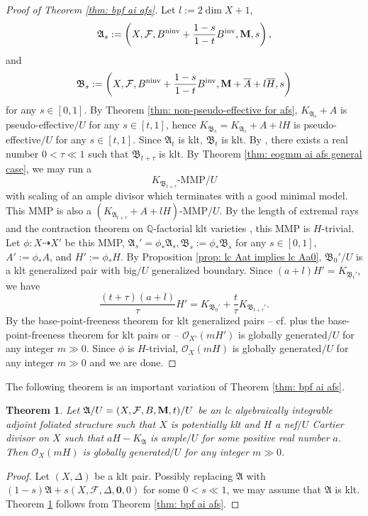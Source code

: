 \documentclass[12pt]{amsart}
\numberwithin{equation}{section}
\newcommand{\Mm}{{\bf{M}}}
\newcommand{\ninv}{\operatorname{ninv}}
\newcommand{\inv}{\operatorname{inv}}
\newcommand{\Aa}{{\mathfrak{A}}}
\newcommand{\Bb}{{\mathfrak{B}}}
\newcommand{\Ff}{\mathcal{F}}
\newtheorem{thm}{Theorem}[section]
\theoremstyle{definition}
\theoremstyle{definition}
\theoremstyle{definition}
\begin{document}
\begin{proof}[Proof of Theorem \ref{thm: bpf ai afs}]
Let $l:=2\dim X+1$, 
$$\Aa_s:=\left(X,\Ff,B^{\ninv}+\frac{1-s}{1-t}B^{\inv},\Mm,s\right),$$
and
$$\Bb_s:=\left(X,\Ff,B^{\ninv}+\frac{1-s}{1-t}B^{\inv},\Mm+\overline{A}+l\overline{H},s\right)$$ 
for any $s\in [0,1]$. By Theorem \ref{thm: non-pseudo-effective for afs}, $K_{\Aa_s}+A$ is pseudo-effective$/U$ for any $s\in [t,1]$, hence $K_{\Bb_s}=K_{\Aa_s}+A+lH$
is pseudo-effective$/U$ for any $s\in [t,1]$. Since $\Aa_t$ is klt, $\Bb_t$ is klt. By \cite[Lemma 3.2]{CHLMSSX24}, there exists a real number $0<\tau\ll 1$ such that $\Bb_{t+\tau}$ is klt. By Theorem \ref{thm: eogmm ai afs general case}, we may run a
$$K_{\Bb_{t+\tau}}\text{-MMP}/U$$
with scaling of an ample divisor which terminates with a good minimal model. This MMP is also a $(K_{\Aa_{t+\tau}}+A+lH)$-MMP$/U$. By the length of extremal rays and the contraction theorem on $\mathbb Q$-factorial klt varieties \cite[Theorem 1.3(2), Theorem 1.4(2)]{CHLMSSX24}, this MMP is $H$-trivial. Let $\phi: X\dashrightarrow X'$ be this MMP, $\Aa_s'=\phi_*\Aa_s,\Bb_s:=\phi_*\Bb_s$ for any $s\in [0,1]$, $A':=\phi_*A$, and $H':=\phi_*H$. By Proposition \ref{prop: lc Aat implies lc Aa0}, $\Bb_0'/U$ is a klt generalized pair with big$/U$ generalized boundary. Since $(a+l)H'=K_{\Bb_t'}$, we have
$$\frac{(t+\tau)(a+l)}{\tau}H'=K_{\Bb_0'}+\frac{t}{\tau}K_{\Bb_{t+\tau}'}.$$
By the base-point-freeness theorem for klt generalized pairs -- 
cf. \cite[Lemma 3.4]{HL22} plus the base-point-freeness theorem for klt pairs or \cite[Theorem 2.2.6]{CHLX23} -- $\mathcal{O}_{X'}(mH')$ is globally generated$/U$ for any integer $m\gg 0$. Since $\phi$ is $H$-trivial, $\mathcal{O}_{X}(mH)$ is globally generated$/U$ for any integer $m\gg 0$ and we are done.
\end{proof}
The following theorem is an important variation of Theorem \ref{thm: bpf ai afs}.

\begin{thm}\label{thm: bpf ai afs lc+a}
   Let $\Aa/U=(X,\Ff,B,\Mm,t)/U$ be an lc algebraically integrable adjoint foliated structure such that $X$ is potentially klt and $H$ a nef$/U$ Cartier divisor on $X$ such that $aH-K_{\Aa}$ is ample$/U$ for some positive real number $a$. Then $\mathcal{O}_X(mH)$ is globally generated$/U$ for any integer $m\gg 0$.
\end{thm}
\begin{proof}
    Let $(X,\Delta)$ be a klt pair. Possibly replacing $\Aa$ with $(1-s)\Aa+s(X,\Ff,\Delta,\bm{0},0)$ for some $0<s\ll 1$, we may assume that $\Aa$ is klt. Theorem \ref{thm: bpf ai afs lc+a} follows from Theorem \ref{thm: bpf ai afs}.
\end{proof}
\end{document}
